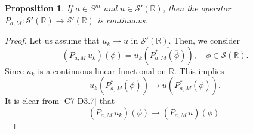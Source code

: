 \documentclass[12pt,a4paper,reqno]{amsproc}
\newtheorem{proposition}[theorem]{Proposition}
\theoremstyle{definition}
\theoremstyle{remark}
\numberwithin{equation}{section}
\begin{document}

\begin{proposition}
If $a \in S^m$ and $u\in \mathcal{S}'(\mathbb{R})$, then the operator $P_{a,M}:\mathcal{S}'(\mathbb{R}) \to \mathcal{S}'(\mathbb{R})$ is continuous.
\end{proposition}
\begin{proof}
Let us assume that $u_k \to u$ in $\mathcal{S}'(\mathbb{R})$. Then, we  consider $$ (P_{a,M}\,u_k)(\phi) = u_k\left(\overline{P^*_{a,M}(\overline{\phi})}\right),\quad \phi \in  \mathcal{S}(\mathbb{R}).$$
Since $u_k$ is a continuous linear functional on $\mathbb{R}$. This implies
$$ u_k\left(\overline{P^*_{a,M}(\overline{\phi})}\right) \to u\left(\overline{P^*_{a,M}(\overline{\phi})}\right).$$ It is clear from \ref{C7-D3.7} that $$(P_{a,M}\,u_k)(\phi)\to (P_{a,M}\,u)(\phi).$$ 
\end{proof}
\end{document}
